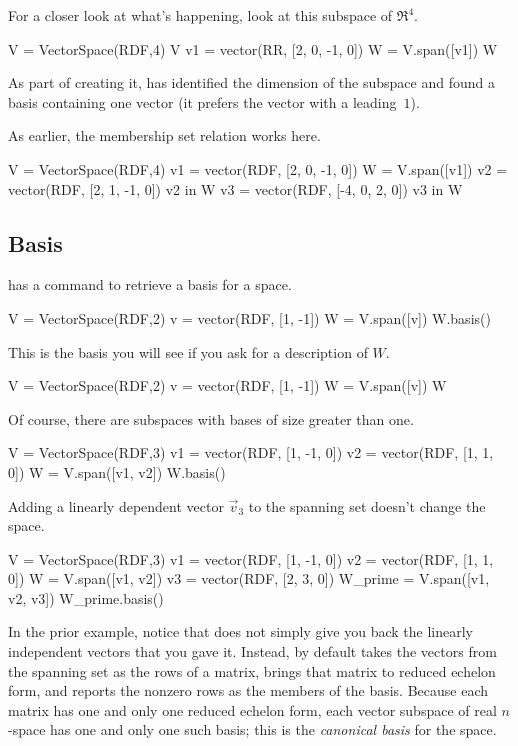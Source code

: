 For a closer look at what's happening, look at this subspace of $\Re^4$.
\begin{sageoutput}
V = VectorSpace(RDF,4)
V
v1 = vector(RR, [2, 0, -1, 0])
W = V.span([v1])
W
\end{sageoutput}
As part of creating it,
\Sage{} has identified the dimension of the subspace and found
a basis containing one vector (it prefers the vector with a leading~$1$).

As earlier, the membership set relation works here.
\begin{sageoutput}[d,0,3]
V = VectorSpace(RDF,4)
v1 = vector(RDF, [2, 0, -1, 0])
W = V.span([v1])
v2 = vector(RDF, [2, 1, -1, 0])
v2 in W
v3 = vector(RDF, [-4, 0, 2, 0])
v3 in W
\end{sageoutput}



\subsection{Basis}
\Sage{} has a command to retrieve a basis for a space.
\begin{sageoutput}
V = VectorSpace(RDF,2)
v = vector(RDF, [1, -1])
W = V.span([v])     
W.basis()
\end{sageoutput}
\noindent
This is the basis you will see if you ask for a description of $W$.
\begin{sageoutput}[d,0,3]
V = VectorSpace(RDF,2)
v = vector(RDF, [1, -1])
W = V.span([v])     
W  
\end{sageoutput}

Of course, there are subspaces with bases of size greater than one.
\begin{sageoutput}
V = VectorSpace(RDF,3)               
v1 = vector(RDF, [1, -1, 0]) 
v2 = vector(RDF, [1, 1, 0]) 
W = V.span([v1, v2])       
W.basis()
\end{sageoutput}
Adding a linearly dependent vector $\vec{v}_3$ to the spanning
set doesn't change the space.
\begin{sageoutput}[d,0,3]
V = VectorSpace(RDF,3)               
v1 = vector(RDF, [1, -1, 0]) 
v2 = vector(RDF, [1, 1, 0]) 
W = V.span([v1, v2])       
v3 = vector(RDF, [2, 3, 0])
W_prime = V.span([v1, v2, v3])
W_prime.basis()
\end{sageoutput}

In the prior example, notice that \Sage{} does not simply
give you back the linearly independent
vectors that you gave it.
Instead, by default \Sage{} takes the vectors from the spanning set 
as the rows of a matrix,
brings that matrix to reduced echelon form, and reports the nonzero 
rows as the members of the basis.
Because each matrix has one and only one reduced echelon form, each 
vector subspace of real $n$-space has one and only one such
basis;
this is the \textit{canonical basis} for the space.

